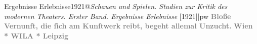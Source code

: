 \begin{ledgroupsized}[t]{13cm}
{{{                  Ergebnisse Erlebnisse1921@\strich\emph{Schauen und Spielen. Studien zur Kritik des modernen Theaters. Erster Band. Ergebnisse Erlebnisse} {[}1921{]}|pw}}}\pend
           {\bigskip}\pstart
           \noindent{}\raggedleft{}\textcolor{gray}{\textbf{Bloße Vernunft, die ſich am Kunſtwerk}}\pend
           \pstart
           \noindent{}\raggedleft{}\textcolor{gray}{\textbf{reibt, begeht allemal Unzucht.}}\pend
           {\bigskip}\pstart
           \noindent{}\centering{}\textcolor{gray}{\textbf{}}\pend
           \pstart
           \noindent{}\centering{}\textcolor{gray}{\textbf{Wien * WILA * Leipzig}}\pend
           
         
         \endnumbering{}\end{ledgroupsized}  \newcommand{\dateiname}{L03051}\newcommand{\titel}{Felix Salten: Widmungsexemplar Schauen und Spielen für Arthur Schnitzler, 22. 9. 1921}\newcommand{\editorInnen}{Martin Anton Müller und Laura Untner}
      